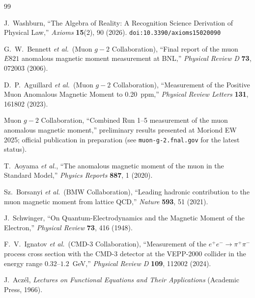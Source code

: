 \documentclass[12pt,a4paper]{article}
\theoremstyle{definition}
\theoremstyle{remark}
\begin{document}
\begin{thebibliography}{99}

J.~Washburn, ``The Algebra of Reality: A Recognition Science Derivation
of Physical Law,'' \emph{Axioms} \textbf{15}(2), 90 (2026).
\texttt{doi:10.3390/axioms15020090}

G.~W.~Bennett \textit{et al.}\ (Muon $g-2$ Collaboration),
``Final report of the muon $E821$ anomalous magnetic moment measurement
at BNL,'' \emph{Physical Review D} \textbf{73}, 072003 (2006).

D.~P.~Aguillard \textit{et al.}\ (Muon $g-2$ Collaboration),
``Measurement of the Positive Muon Anomalous Magnetic Moment to 0.20~ppm,''
\emph{Physical Review Letters} \textbf{131}, 161802 (2023).

Muon $g-2$ Collaboration, ``Combined Run 1--5 measurement of the muon
anomalous magnetic moment,'' preliminary results presented at Moriond EW
2025; official publication in preparation (see \texttt{muon-g-2.fnal.gov}
for the latest status).

T.~Aoyama \textit{et al.}, ``The anomalous magnetic moment of the muon
in the Standard Model,'' \emph{Physics Reports} \textbf{887}, 1 (2020).

Sz.~Borsanyi \textit{et al.}\ (BMW Collaboration),
``Leading hadronic contribution to the muon magnetic moment from lattice
QCD,'' \emph{Nature} \textbf{593}, 51 (2021).

J.~Schwinger, ``On Quantum-Electrodynamics and the Magnetic Moment of
the Electron,'' \emph{Physical Review} \textbf{73}, 416 (1948).

F.~V.~Ignatov \textit{et al.}\ (CMD-3 Collaboration),
``Measurement of the $e^+e^- \to \pi^+\pi^-$ process cross section with
the CMD-3 detector at the VEPP-2000 collider in the energy range
$0.32$--$1.2$~GeV,'' \emph{Physical Review D} \textbf{109}, 112002 (2024).

J.~Acz\'el, \emph{Lectures on Functional Equations and Their
Applications} (Academic Press, 1966).

\end{thebibliography}
\end{document}
